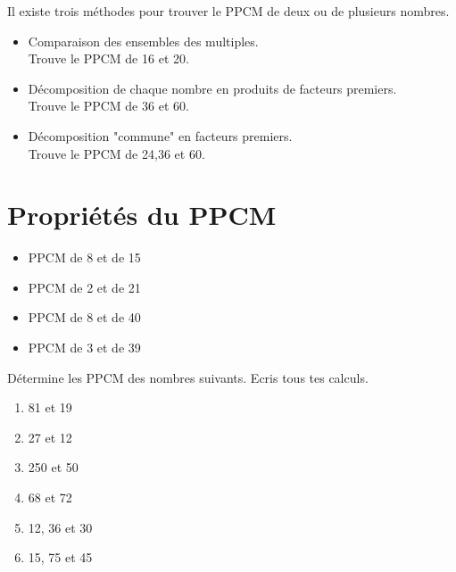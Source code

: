 \documentclass[../math2.tex]{subfiles}
\begin{document}
Il existe trois méthodes pour trouver le PPCM de deux ou de plusieurs nombres.
\begin{itemize}[label=$\bullet$, itemsep=5cm]
    \item Comparaison des ensembles des multiples.\\
          \exemple Trouve le PPCM de 16 et 20.

    \item Décomposition de chaque nombre en produits de facteurs premiers. \\
          \exemple Trouve le PPCM de 36 et 60.

    \item Décomposition "commune" en facteurs premiers.\\
          \exemple Trouve le PPCM de 24,36 et 60.
\end{itemize}
\newpage

\section{Propriétés du PPCM}

\exemple
\begin{itemize}[label=$\bullet$, cols=2]
    \item PPCM de 8 et de 15
    \item PPCM de 2 et de 21
\end{itemize}
\vfil
{}

\exemple
\begin{itemize}[label=$\bullet$, cols=2]
    \item PPCM de 8 et de 40
    \item PPCM de 3 et de 39
\end{itemize}
\newpage
\begin{exercise}
    Détermine les PPCM des nombres suivants. Ecris tous tes calculs.
    \begin{enumerate}[cols=2, itemsep=5cm]
        \item 81 et 19
        \item 27 et 12
        \item 250 et 50
        \item 68 et 72
        \item 12, 36 et 30
        \item 15, 75 et 45
    \end{enumerate}
\end{exercise}
\end{document}
